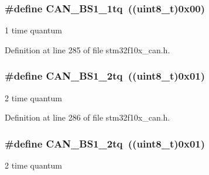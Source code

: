 \subsubsection[{\texorpdfstring{C\+A\+N\+\_\+\+B\+S1\+\_\+1tq}{CAN_BS1_1tq}}]{\setlength{\rightskip}{0pt plus 5cm}\#define C\+A\+N\+\_\+\+B\+S1\+\_\+1tq~(({\bf uint8\+\_\+t})0x00)}\hypertarget{group___c_a_n__time__quantum__in__bit__segment__1_ga76b8fb0815b7a3f398fffe72dda0bc04}{}\label{group___c_a_n__time__quantum__in__bit__segment__1_ga76b8fb0815b7a3f398fffe72dda0bc04}
1 time quantum 

Definition at line 285 of file stm32f10x\+\_\+can.\+h.

\subsubsection[{\texorpdfstring{C\+A\+N\+\_\+\+B\+S1\+\_\+2tq}{CAN_BS1_2tq}}]{\setlength{\rightskip}{0pt plus 5cm}\#define C\+A\+N\+\_\+\+B\+S1\+\_\+2tq~(({\bf uint8\+\_\+t})0x01)}\hypertarget{group___c_a_n__time__quantum__in__bit__segment__1_ga1544ecf902e6173859d60cff9530971a}{}\label{group___c_a_n__time__quantum__in__bit__segment__1_ga1544ecf902e6173859d60cff9530971a}
2 time quantum 

Definition at line 286 of file stm32f10x\+\_\+can.\+h.

\subsubsection[{\texorpdfstring{C\+A\+N\+\_\+\+B\+S1\+\_\+2tq}{CAN_BS1_2tq}}]{\setlength{\rightskip}{0pt plus 5cm}\#define C\+A\+N\+\_\+\+B\+S1\+\_\+2tq~(({\bf uint8\+\_\+t})0x01)}\hypertarget{group___c_a_n__time__quantum__in__bit__segment__1_ga1544ecf902e6173859d60cff9530971a}{}\label{group___c_a_n__time__quantum__in__bit__segment__1_ga1544ecf902e6173859d60cff9530971a}
2 time quantum 

